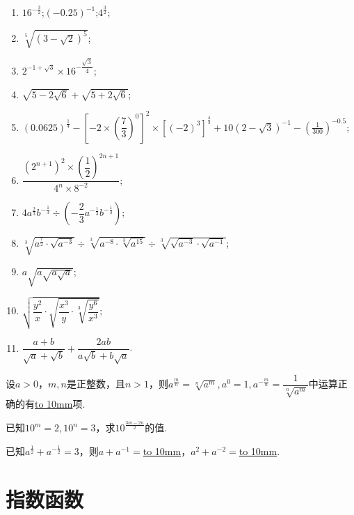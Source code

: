 \documentclass[lang=cn,math=cm,chinesefont=nofont,11pt,scheme=chinese,twocol]{elegantbook}
\begin{document}
\begin{spacing}{1.8}
  \begin{enumerate}
    \item $16^{-\frac{3}{2}}$;$\left(-0.25\right)^{-1}$;$4^{\frac32}$;
    \item $\sqrt[5]{(3-\sqrt{2})^5}$;
    \item $2^{-1+\sqrt{3}}\times16^{-\dfrac{\sqrt{3}}4}$;
    \item $\sqrt{5-2\sqrt6}+\sqrt{5+2\sqrt6}$;
    \item $(0.0625)^{\frac{1}{4}}-\left[-2\times\left(\dfrac{7}{3}\right)^{0}\right]^{2}\times\left[\left(-2\right)^{3}\right]^{\frac{4}{3}}+10\left(2-\sqrt{3}\right)^{-1}-\left(\frac{1}{300}\right)^{-0.5}$;
    \item $\dfrac{\left(2^{n+1}\right)^2\times\left(\dfrac{1}{2}\right)^{2n+1}}{4^n\times8^{-2}}$;
    \item $4a^{\frac{2}{3}}b^{-\frac{1}{3}}\div\left(-\dfrac{2}{3}a^{-\frac{1}{3}}b^{-\frac{1}{3}}\right)$;
    \item $\sqrt[3]{a^{\frac{7}{2}}\cdot\sqrt{a^{-3}}}\div\sqrt[3]{a^{-8}\cdot\sqrt[3]{a^{15}}}\div\sqrt[3]{\sqrt{a^{-3}}\cdot\sqrt{a^{-1}}}$;
    \item $a\sqrt{a\sqrt{a\sqrt{a}}}$;
    \item $\sqrt{\dfrac{y^{2}}{x}\cdot\sqrt{\dfrac{x^{3}}{y}\cdot\sqrt[3]{\dfrac{y^{6}}{x^{3}}}}}$;
    \item $\dfrac{a+b}{\sqrt{a}+\sqrt{b}}+\dfrac{2ab}{a\sqrt{b}+b\sqrt{a}}$.
  \end{enumerate}
\end{spacing}

\begin{exercise}\label{2017RJA_bx1_P109.2.2}
  设$a>0$，$m,n$是正整数，且$n>1$，则$a^{\frac{m}{n}}=\sqrt[n]{a^m} , a^0=1 , a^{-\frac{m}{n}}=\dfrac{1}{\sqrt[n]{a^m}}$中运算正确的有\underline{\hbox to 10mm{}}项.
\end{exercise}

\begin{exercise}\label{2017RJA_bx1_P110.7.1}
  已知$10^m=2,10^n=3$，求$10^{\frac{3m-2n}{2}}$的值.
\end{exercise}

\begin{exercise}
  已知$a^\frac12+a^{-\frac12}=3$，则$a+a^{-1}=$\underline{\hbox to 10mm{}}，$a^{2}+a^{-2}=$\underline{\hbox to 10mm{}}.
\end{exercise}

\section{指数函数}
\end{document}
